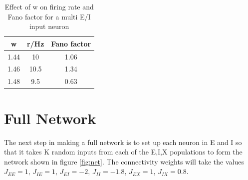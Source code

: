 \documentclass[twoside,twocolumn]{article}
\begin{document}
\begin{table}[h]
\centering
\begin{tabular}{ c | c | c }
w& r/Hz & Fano factor \\ 
\midrule
1.44&10&1.06 \\
1.46&10.5&1.34\\
1.48&9.5& 0.63\\

\end{tabular}
\caption{Effect of w on firing rate and Fano factor for a multi E/I input neuron}
\label{tab:fr2}
\end{table}
\section{Full Network}
The next step in making a full network is to set up each neuron in E and I so that it takes K random inputs from each of the E,I,X populations to form the network shown in figure \ref{fig:net}. The connectivity weights will take the values $J_{EE}=1$, $J_{IE}=1$, $J_{EI}=-2$, $J_{II}=-1.8$, $J_{EX}=1$, $J_{IX}=0.8$.
\end{document}
